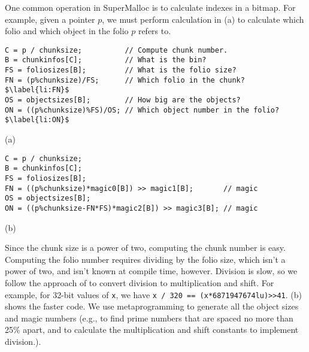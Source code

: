 \documentclass{sigplanconf}
\newcommand{\code}[1]{\texttt{#1}}
\begin{document}

One common operation in SuperMalloc is to calculate indexes in a
bitmap.  For example, given a pointer $p$, we must perform calculation
in (a) to calculate which folio and which object in
the folio $p$ refers to.

\begin{figure*}
\begin{verbatim}
C = p / chunksize;          // Compute chunk number.
B = chunkinfos[C];          // What is the bin?
FS = foliosizes[B];         // What is the folio size?
FN = (p%chunksize)/FS;      // Which folio in the chunk?$\label{li:FN}$
OS = objectsizes[B];        // How big are the objects?
ON = ((p%chunksize)%FS)/OS; // Which object number in the folio?$\label{li:ON}$
\end{verbatim}
\begin{center}
(a)
\end{center}
\begin{verbatim}
C = p / chunksize;
B = chunkinfos[C];
FS = foliosizes[B];
FN = ((p%chunksize)*magic0[B]) >> magic1[B];       // magic
OS = objectsizes[B];
ON = ((p%chunksize-FN*FS)*magic2[B]) >> magic3[B]; // magic
\end{verbatim}
\begin{center}
(b)
\end{center}
\caption{The calculation to compute the folio number in the chunk,
  \code{FN}, and the object number in the folio \code{ON}, so that the
  bitmap for the free objects in the folio can be updated.  (a) shows
  the code with expensive divisions in .  (b) shows
  the code with the divisions replaced by multiplication and shift.}
\label{fig:bitindex}
\end{figure*}


Since the chunk size is a power of two, computing the chunk number is
easy.  Computing the folio number requires dividing by the folio size,
which isn't a power of two, and isn't known at compile time, however.
Division is slow, so we follow the approach of
\cite{MagenheimerPePe87} to convert division to multiplication and
shift.  For example, for 32-bit values of \code{x}, we have
\texttt{x / 320 == (x*6871947674lu)>>41}.  (b)
shows the faster code.  We use metaprogramming to generate all the
object sizes and magic numbers (e.g., to find prime numbers that are
spaced no more than 25\% apart, and to calculate the multiplication
and shift constants to implement division.).
\end{document}
